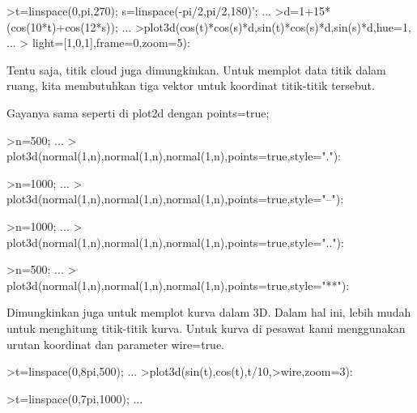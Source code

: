 \documentclass[a4paper,10pt]{article}
\begin{document}
\begin{eulernotebook}
\begin{eulercomment}
\begin{eulercomment}
\begin{eulerprompt}
\end{eulerprompt}
\begin{eulerprompt}
>t=linspace(0,pi,270); s=linspace(-pi/2,pi/2,180)'; ...
>d=1+15*(cos(10*t)+cos(12*s)); ...
>plot3d(cos(t)*cos(s)*d,sin(t)*cos(s)*d,sin(s)*d,hue=1, ...
>  light=[1,0,1],frame=0,zoom=5):
\end{eulerprompt}
\begin{eulercomment}
Tentu saja, titik cloud juga dimungkinkan. Untuk memplot data titik
dalam ruang, kita membutuhkan tiga vektor untuk koordinat titik-titik
tersebut.

Gayanya sama seperti di plot2d dengan points=true;
\end{eulercomment}
\begin{eulerprompt}
>n=500;  ...
>  plot3d(normal(1,n),normal(1,n),normal(1,n),points=true,style="."):
\end{eulerprompt}
\begin{eulerprompt}
>n=1000;  ...
>  plot3d(normal(1,n),normal(1,n),normal(1,n),points=true,style="--"):
\end{eulerprompt}
\begin{eulerprompt}
>n=1000;  ...
>  plot3d(normal(1,n),normal(1,n),normal(1,n),points=true,style=".."):
\end{eulerprompt}
\begin{eulerprompt}
>n=500;  ...
>  plot3d(normal(1,n),normal(1,n),normal(1,n),points=true,style="**"):
\end{eulerprompt}
\begin{eulercomment}
Dimungkinkan juga untuk memplot kurva dalam 3D. Dalam hal ini, lebih
mudah untuk menghitung titik-titik kurva. Untuk kurva di pesawat kami
menggunakan urutan koordinat dan parameter wire=true.
\end{eulercomment}
\begin{eulerprompt}
>t=linspace(0,8pi,500); ...
>plot3d(sin(t),cos(t),t/10,>wire,zoom=3):
\end{eulerprompt}
\begin{eulerprompt}
>t=linspace(0,7pi,1000); ...

\end{eulerprompt}
\end{eulercomment}
\end{eulercomment}
\end{eulernotebook}
\end{document}
